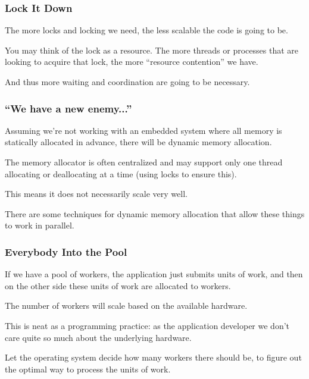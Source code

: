 \begin{frame}
\frametitle{Lock It Down}
The more locks and locking we need, the less scalable the code is going to be. 

You may think of the lock as a resource. 
The more threads or processes that are looking to acquire that lock, the more ``resource contention'' we have.

And thus more waiting and coordination are going to be necessary.

\end{frame}

\begin{frame}
\frametitle{``We have a new enemy...''}

Assuming we're not working with an embedded system where all memory is statically allocated in advance, there will be dynamic memory allocation. 

The memory allocator is often centralized and may support only one thread allocating or deallocating at a time (using locks to ensure this). 

This means it does not necessarily scale very well.

There are some techniques for dynamic memory allocation that allow these things to work in parallel.


\end{frame}


\begin{frame}
\frametitle{Everybody Into the Pool}

If we have a pool of workers, the application just submits units of work, and then on the other side these units of work are allocated to workers. 

The number of workers will scale based on the available hardware. 

This is neat as a programming practice: as the application developer we don't care quite so much about the underlying hardware. 

Let the operating system decide how many workers there should be, to figure out the optimal way to process the units of work.

\end{frame}


